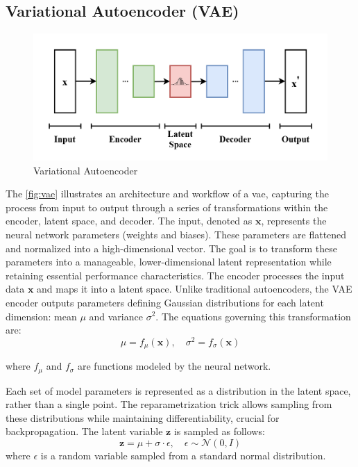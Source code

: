 \documentclass{ioereport}
\begin{document}
    \subsection{Variational Autoencoder (VAE) }
        \begin{figure}[H]
        \centering
        \includegraphics[width=0.95\linewidth]{assets/VAE_Basic.png}
        \caption{Variational Autoencoder}
        \label{fig:vae}
    \end{figure}
    The \autoref{fig:vae} illustrates an architecture and workflow of a \gls{vae}, capturing the process from input to output through a series of transformations within the encoder, latent space, and decoder. The input, denoted as $\mathbf{x}$, represents the neural network parameters (weights and biases). These parameters are flattened and normalized into a high-dimensional vector. The goal is to transform these parameters into a manageable, lower-dimensional latent representation while retaining essential performance characteristics. The encoder processes the input data $\mathbf{x}$ and maps it into a latent space. Unlike traditional autoencoders, the VAE encoder outputs parameters defining Gaussian distributions for each latent dimension: mean $\mu$ and variance $\sigma^2$. The equations governing this transformation are:
    \begin{equation}
           \mu = f_{\mu}(\mathbf{x}), \quad \sigma^2 = f_{\sigma}(\mathbf{x})
    \end{equation}

    where $f_{\mu}$ and $f_{\sigma}$ are functions modeled by the neural network.

    Each set of model parameters is represented as a distribution in the latent space, rather than a single point. The reparametrization trick allows sampling from these distributions while maintaining differentiability, crucial for backpropagation. The latent variable $\mathbf{z}$ is sampled as follows:
    \begin{equation}
    \mathbf{z} = \mu + \sigma \cdot \epsilon, \quad \epsilon \sim \mathcal{N}(0, I)
    \end{equation}
    where $\epsilon$ is a random variable sampled from a standard normal distribution.
\end{document}
